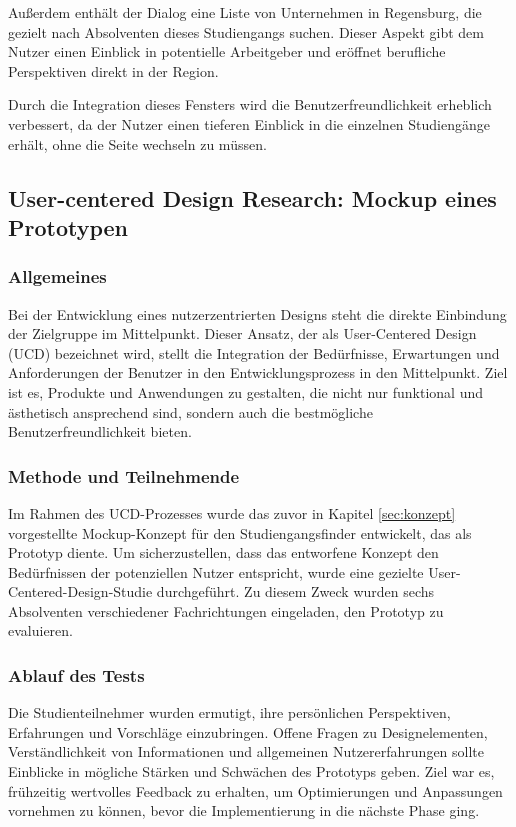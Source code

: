 Außerdem enthält der Dialog eine Liste von Unternehmen in Regensburg, die
gezielt nach Absolventen dieses Studiengangs suchen. Dieser Aspekt gibt dem
Nutzer einen Einblick in potentielle Arbeitgeber und eröffnet berufliche
Perspektiven direkt in der Region.

Durch die Integration dieses Fensters wird die Benutzerfreundlichkeit erheblich 
verbessert, da der Nutzer einen tieferen Einblick in die einzelnen Studiengänge
erhält, ohne die Seite wechseln zu müssen.

\subsection{User-centered Design Research: Mockup eines Prototypen}

\subsubsection{Allgemeines}
Bei der Entwicklung eines nutzerzentrierten Designs steht die direkte Einbindung
der Zielgruppe im Mittelpunkt. Dieser Ansatz, der als User-Centered Design (UCD) 
bezeichnet wird, stellt die Integration der Bedürfnisse, Erwartungen und
Anforderungen der Benutzer in den Entwicklungsprozess in den Mittelpunkt. Ziel
ist es, Produkte und Anwendungen zu gestalten, die nicht nur funktional und
ästhetisch ansprechend sind, sondern auch die bestmögliche
Benutzerfreundlichkeit bieten.

\subsubsection{Methode und Teilnehmende}
Im Rahmen des UCD-Prozesses wurde das zuvor in Kapitel \ref{sec:konzept}
vorgestellte Mockup-Konzept für den Studiengangsfinder entwickelt, das als
Prototyp diente. Um sicherzustellen, dass das entworfene Konzept den
Bedürfnissen der potenziellen Nutzer entspricht, wurde eine gezielte 
User-Centered-Design-Studie durchgeführt. Zu diesem Zweck wurden sechs
Absolventen verschiedener Fachrichtungen eingeladen, den Prototyp zu evaluieren.

\subsubsection{Ablauf des Tests}
Die Studienteilnehmer wurden ermutigt, ihre persönlichen Perspektiven,
Erfahrungen und Vorschläge einzubringen. Offene Fragen zu Designelementen,
Verständlichkeit von Informationen und allgemeinen Nutzererfahrungen sollte
Einblicke in mögliche Stärken und Schwächen des Prototyps geben. Ziel war es, 
frühzeitig wertvolles Feedback zu erhalten, um Optimierungen und Anpassungen
vornehmen zu können, bevor die Implementierung in die nächste Phase ging.

